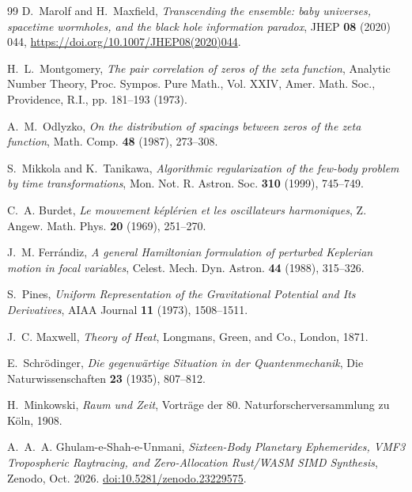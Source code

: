 \documentclass[11pt,a4paper,reqno]{article}
\theoremstyle{plain}
\theoremstyle{definition}
\theoremstyle{remark}
\numberwithin{equation}{section}
\begin{document}
\begin{thebibliography}{99}
D.~Marolf and H.~Maxfield,
\textit{Transcending the ensemble: baby universes, spacetime wormholes, and the black hole information paradox},
JHEP \textbf{08} (2020) 044, \url{https://doi.org/10.1007/JHEP08(2020)044}.

H.~L.~Montgomery,
\textit{The pair correlation of zeros of the zeta function},
Analytic Number Theory, Proc. Sympos. Pure Math., Vol. XXIV, Amer. Math. Soc., Providence, R.I., pp. 181--193 (1973).

A.~M.~Odlyzko,
\textit{On the distribution of spacings between zeros of the zeta function},
Math. Comp. \textbf{48} (1987), 273--308.

S.~Mikkola and K.~Tanikawa,
\textit{Algorithmic regularization of the few-body problem by time transformations},
Mon. Not. R. Astron. Soc. \textbf{310} (1999), 745--749.

C.~A. Burdet,
\textit{Le mouvement k\'{e}pl\'{e}rien et les oscillateurs harmoniques},
Z. Angew. Math. Phys. \textbf{20} (1969), 251--270.

J.~M. Ferr\'{a}ndiz,
\textit{A general Hamiltonian formulation of perturbed Keplerian motion in focal variables},
Celest. Mech. Dyn. Astron. \textbf{44} (1988), 315--326.

S.~Pines,
\textit{Uniform Representation of the Gravitational Potential and Its Derivatives},
AIAA Journal \textbf{11} (1973), 1508--1511.

J.~C. Maxwell,
\textit{Theory of Heat},
Longmans, Green, and Co., London, 1871.

E.~Schr{\"o}dinger,
\textit{Die gegenw{\"a}rtige Situation in der Quantenmechanik},
Die Naturwissenschaften \textbf{23} (1935), 807--812.

H.~Minkowski,
\textit{Raum und Zeit},
Vortr{\"a}ge der 80. Naturforscherversammlung zu K{\"o}ln, 1908.

A.~A.~A. Ghulam-e-Shah-e-Unmani,
\textit{Sixteen-Body Planetary Ephemerides, VMF3 Tropospheric Raytracing, and Zero-Allocation Rust/WASM SIMD Synthesis},
Zenodo, Oct. 2026. \href{https://doi.org/10.5281/zenodo.23229575}{doi:10.5281/zenodo.23229575}.

\end{thebibliography}
\end{document}
